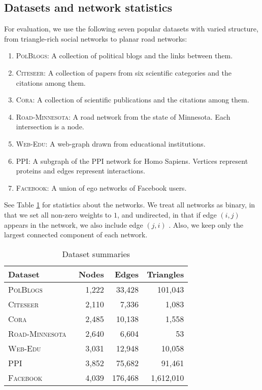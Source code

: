 \subsection{Datasets and network statistics}\label{sec:dsets_net_stats}
For evaluation, we use the following seven popular datasets with varied structure, from triangle-rich social networks to planar road networks:
%
\begin{enumerate}
\item \textsc{PolBlogs}: A collection of political blogs and the links between them.
\item \textsc{Citeseer}: A collection of papers from six scientific categories and the citations among them.
\item \textsc{Cora}: A collection of scientific publications and the citations among them.
\item \textsc{Road-Minnesota}: A road network from the state of Minnesota. Each intersection is a node.
\item \textsc{Web-Edu}: A web-graph drawn from educational institutions.
\item \textsc{PPI}: A subgraph of the PPI network for Homo Sapiens. Vertices represent proteins and edges represent interactions.
\item \textsc{Facebook}: A union of ego networks of Facebook users.
\end{enumerate}
%
See Table \ref{sample-table} for statistics about the networks. We treat all networks as binary, in that we set all non-zero weights to $1$, and undirected, in that if edge $(i,j)$ appears in the network, we also include edge $(j,i)$ . Also, we keep only the largest connected component of each network.

\begin{table}
  \caption{Dataset summaries}
  \label{sample-table}
  \centering
  \begin{tabular}{lrrr}
    \toprule
    Dataset  & Nodes           & Edges       & Triangles \\
    \midrule
    \textsc{PolBlogs}~\cite{adamic2005political} & 1,222 & 33,428 & 101,043\\
    \textsc{Citeseer}~\cite{sen2008collective} & 2,110  & 7,336 & 1,083 \\
    \textsc{Cora}~\cite{sen2008collective}     & 2,485 & 10,138 & 1,558 \\
    \textsc{Road-Minnesota}~\cite{nr} & 2,640 & 6,604 & 53 \\
    \textsc{Web-Edu}~\cite{gleich2004fast} & 3,031 & 12,948 & 10,058 \\
    \textsc{PPI}~\cite{stark2010biogrid} & 3,852 & 75,682 & 91,461 \\
    \textsc{Facebook}~\cite{leskovec2012learning} & 4,039 & 176,468 & 1,612,010 \\
    \bottomrule
  \end{tabular}
\end{table}


